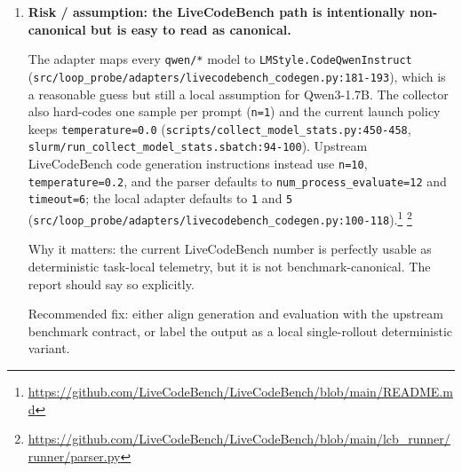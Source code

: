 \documentclass[11pt]{article}
\begin{document}
\begin{enumerate}
Why it matters: if the model emits reasoning, re-lists options, or leaves a thought
trace before the final answer, the scorer can assign the wrong label even when the
model ``meant'' the correct option. The earlier thinking-mode bug increases the
chance of exactly this failure mode.

Recommended fix: require a structured final field (for example a terminal
\texttt{Final answer: X} or JSON answer slot) and parse only that field. One caveat:
the current collector does not checkpoint raw MCQ completions, so this bug path is
proven by the parser logic but cannot be quantified retroactively on the shipped
bundle.

\item \textbf{Risk / assumption: the LiveCodeBench path is intentionally non-canonical
but is easy to read as canonical.}

The adapter maps every \texttt{qwen/*} model to
\texttt{LMStyle.CodeQwenInstruct}
(\texttt{src/loop\_probe/adapters/livecodebench\_codegen.py:181-193}), which is a
reasonable guess but still a local assumption for Qwen3-1.7B. The collector also
hard-codes one sample per prompt (\texttt{n=1}) and the current launch policy keeps
\texttt{temperature=0.0}
(\texttt{scripts/collect\_model\_stats.py:450-458},
\texttt{slurm/run\_collect\_model\_stats.sbatch:94-100}). Upstream LiveCodeBench code
generation instructions instead use \texttt{n=10}, \texttt{temperature=0.2}, and the
parser defaults to \texttt{num\_process\_evaluate=12} and \texttt{timeout=6}; the
local adapter defaults to \texttt{1} and \texttt{5}
(\texttt{src/loop\_probe/adapters/livecodebench\_codegen.py:100-118}).\footnote{\url{https://github.com/LiveCodeBench/LiveCodeBench/blob/main/README.md}}
\footnote{\url{https://github.com/LiveCodeBench/LiveCodeBench/blob/main/lcb_runner/runner/parser.py}}

Why it matters: the current LiveCodeBench number is perfectly usable as deterministic
task-local telemetry, but it is not benchmark-canonical. The report should say so
explicitly.

Recommended fix: either align generation and evaluation with the upstream benchmark
contract, or label the output as a local single-rollout deterministic variant.
\end{enumerate}
\end{document}
